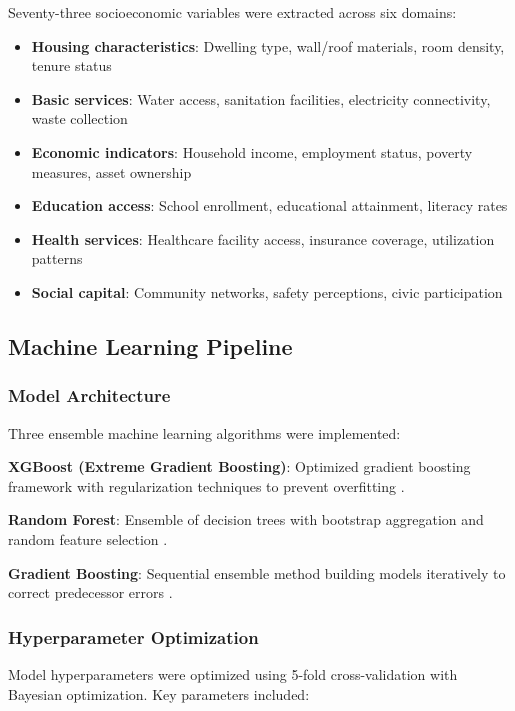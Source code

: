\documentclass[journal,article,submit,pdftex,moreauthors]{Definitions/mdpi}
\begin{document}
Seventy-three socioeconomic variables were extracted across six domains:
\begin{itemize}
\item \textbf{Housing characteristics}: Dwelling type, wall/roof materials, room density, tenure status
\item \textbf{Basic services}: Water access, sanitation facilities, electricity connectivity, waste collection
\item \textbf{Economic indicators}: Household income, employment status, poverty measures, asset ownership
\item \textbf{Education access}: School enrollment, educational attainment, literacy rates
\item \textbf{Health services}: Healthcare facility access, insurance coverage, utilization patterns
\item \textbf{Social capital}: Community networks, safety perceptions, civic participation
\end{itemize}

\subsection{Machine Learning Pipeline}

\subsubsection{Model Architecture}

Three ensemble machine learning algorithms were implemented:

\textbf{XGBoost (Extreme Gradient Boosting)}: Optimized gradient boosting framework with regularization techniques to prevent overfitting \cite{chen2016xgboost}.

\textbf{Random Forest}: Ensemble of decision trees with bootstrap aggregation and random feature selection \cite{breiman2001random}.

\textbf{Gradient Boosting}: Sequential ensemble method building models iteratively to correct predecessor errors \cite{friedman2001greedy}.

\subsubsection{Hyperparameter Optimization}

Model hyperparameters were optimized using 5-fold cross-validation with Bayesian optimization. Key parameters included:
\end{document}
